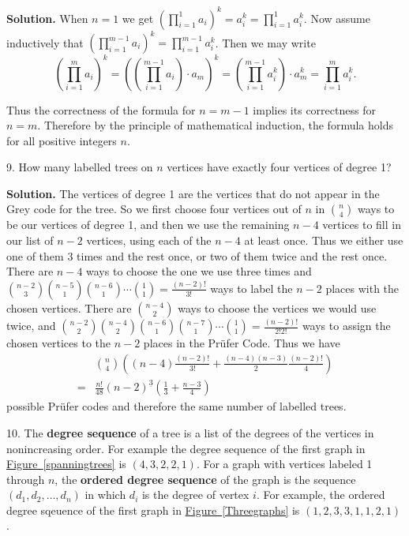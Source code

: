 \documentclass[10pt,]{book}
\newcommand{\terminology}[1]{\textbf{#1}}
\theoremstyle{plain}
\theoremstyle{definition}
\theoremstyle{definition}
\numberwithin{equation}{chapter}
\newcommand{\amp}{&}
\begin{document}
\begin{exerciselist}
\noindent\textbf{Solution.}\hypertarget{solution-187}{}\quad
When \(n=1\) we get \(\displaystyle\left(\prod_{i=1}^1 a_i\right)^k=a_i^k =\prod_{i=1}^1a_i^k\). Now assume inductively that \(\displaystyle\left(\prod_{i=1}^{m-1}a_i\right)^k=\prod_{i=1}^{m-1}a_i^k\). Then we may write%
\begin{equation*}
\left(\prod_{i=1}^ma_i\right)^k=\left(\left(\prod_{i=1}^{m-1}
a_i\right)\cdot a_m\right)^k=\left(\prod_{i=1}^{m-1}
a_i^k\right)\cdot a_m^k=\prod_{i=1}^m a_i^k.
\end{equation*}
%
\par
Thus the correctness of the formula for \(n=m-1\) implies its correctness for \(n=m\). Therefore by the principle of mathematical induction, the formula holds for all positive integers \(n\).%
\item[9.]\hypertarget{exercise-21}{}How many labelled trees on \(n\) vertices have exactly four vertices of degree 1?%
\par\smallskip
\par\smallskip
\noindent\textbf{Solution.}\hypertarget{solution-188}{}\quad
The vertices of degree 1 are the vertices that do not appear in the Grey code for the tree. So we first choose four vertices out of \(n\) in \(\binom{n}{4}\) ways to be our vertices of degree 1, and then we use the remaining \(n-4\) vertices to fill in our list of \(n-2\) vertices, using each of the \(n-4\) at least once. Thus we either use one of them 3 times and the rest once, or two of them twice and the rest once. There are \(n-4\) ways to choose the one we use three times and \(\binom{n-2}{3}\binom{n-5}{1}\binom{n-6}{1}\cdots\binom{1}{1}=\frac{(n-2)!}{3!}\) ways to label the \(n-2\) places with the chosen vertices. There are \(\binom{n-4}{2}\) ways to choose the vertices we would use twice, and \(\binom{n-2}{2}\binom{n-4}{2}\binom{n-6}{1}\binom{n-7}{1}\cdots \binom{1}{1}=\frac{(n-2)!}{2!2!}\) ways to assign the chosen vertices to the \(n-2\) places in the Prüfer Code. Thus we have%
\begin{align*}
\amp \binom{n}{4}\left((n-4)\frac{(n-2)!}{3!} +\frac{(n-4)(n-3)}{2}\frac{(n-2)!}{4}\right)\\
=\amp \frac{n!}{48}(n-2)^{\underline{3}}\left(\frac{1}{3} +\frac{n-3}{4}\right)
\end{align*}
possible Prüfer codes and therefore the same number of labelled trees.%
\item[10.]\hypertarget{exercise-22}{}The \terminology{degree sequence} of a tree is a list of the degrees of the vertices in nonincreasing order.  For example the degree sequence of the first graph in \hyperref[spanningtrees]{Figure~\ref{spanningtrees}} is \((4,3,2,2,1)\).  For a graph with vertices labeled 1 through \(n\), the \terminology{ordered degree sequence} of the graph is the sequence \((d_1,d_2,\dots,d_n)\) in which \(d_i\) is the degree of vertex \(i\). For example, the ordered degree sqeuence of the first graph in \hyperref[Threegraphs]{Figure~\ref{Threegraphs}} is \((1,2,3,3,1,1,2,1)\). \leavevmode%

\end{exerciselist}
\end{document}
